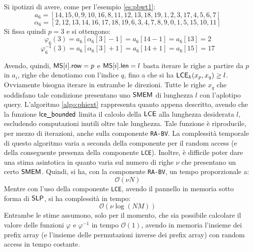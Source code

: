 \begin{esempio}
  Si ipotizzi di avere, come per l'esempio \ref{es:pbwt1}:
  \[a_6=[14,15,0,9,10,16,8,11,12,13,18,19,1,2,3,17,4,5,6,7]\]
  \[\alpha_6=[2,12,13,14,16,17,18,19,6,3,4,7,8,9,0,1,5,15,10,11]\]
  Si fissa quindi $p=3$ e si ottengono:
  \[\varphi_6(3)=a_6[\alpha_6[3]-1]=a_6[14-1]=a_6[13]=2\]
  \[\varphi^{-1}_6(3)=a_6[\alpha_6[3]+1]=a_6[14+1]=a_6[15]=17\]
\end{esempio}
Avendo, quindi, $\mbox{\rm {\sf MS}}[i].\mbox{\rm {\sf row}}=p$ e $\mbox{\rm {\sf MS}}[i].\mbox{\rm {\sf len}}=l$ basta iterare le righe a
partire da 
$p$ in $a_i$, righe che denotiamo con l'indice $q$, fino a che si ha 
$\mbox{\rm {\sf LCE}}_k(x_p, x_q)\geq l$. Ovviamente bisogna iterare in entrambe le
direzioni. Tutte le righe $x_q$ che soddisfano tale condizione presentano uno
$\mbox{\rm {\sf SMEM}}$ di lunghezza $l$ con 
l'aplotipo query. L'algoritmo \ref{algo:phiext} rappresenta quanto
appena descritto, avendo che la funzione $\mbox{\rm {\sf lce\_bounded}}$ limita il calcolo
della 
$\mbox{\rm {\sf LCE}}$ alla lunghezza desiderata $l$, escludendo computazioni inutili oltre tale
lunghezza. Tale funzione è riproducile, per mezzo di iterazioni, anche sulla
componente \texttt{RA-BV}. La complessità temporale di questo algoritmo
varia a seconda della componente per il random access (e della conseguente
presenza della 
componente \texttt{LCE}). Inoltre, è difficile poter dare una stima asintotica
in quanto varia sul numero di righe $\nu$ che presentano un certo
$\mbox{\rm {\sf SMEM}}$. Quindi, si ha, con la 
componente \texttt{RA-BV}, un tempo proporzionale a:
\begin{equation}
  \label{eq:phiaccbv}
  \mathcal{O}(\nu N)
\end{equation}
Mentre con l'uso della componente \texttt{LCE}, avendo il pannello in memoria
sotto forma di $\mbox{\rm {\sf SLP}}$, si ha complessità in tempo:
\begin{equation}
  \label{eq:phiaccbv2}
  \mathcal{O}(\nu\log (NM))
\end{equation}
Entrambe le stime assumono, solo per il momento, che sia possibile calcolare il
valore delle funzioni $\varphi$ e $\varphi^{-1}$ in tempo $\mathcal{O}(1)$,
avendo in 
memoria l'insieme dei prefix array (e l'insieme delle permutazioni inverse dei
prefix array) con random access in tempo costante.\\
